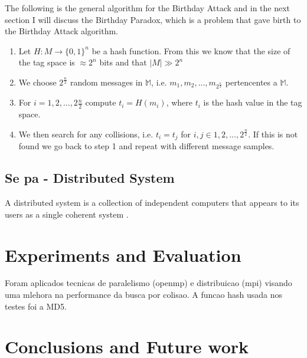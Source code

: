 \documentclass[12pt]{article}
\begin{document}
The following is the general algorithm for the Birthday Attack and in the next section I will discuss
the Birthday Paradox, which is a problem that gave birth to the Birthday Attack algorithm.
\begin{enumerate}
\item Let \(H : M \to \{0,1\}^n\) be a hash function. From this we know that the size of the tag space is \(\approx 2^n\) bits
and that \(| M | \gg 2^n\)
\item We choose \(2^\frac{n}{2}\) random messages in \(\mathbb{M}\), i.e. \(m_1, m_2, ... , m_{2^\frac{n}{2}}\) 
pertencentes a \(\mathbb{M}\).
\item For \(i = 1,2, ... , 2\frac{n}{2}\) compute \(t_i = H(m_i)\), where \(t_i\) is the hash value in the tag space.
\item We then search for any collisions, i.e. \(t_i = t_j\) for \(i, j \in {1, 2, ... , 2^\frac{n}{2}}\). If this is not
found we go back to step 1 and repeat with different message samples.
\end{enumerate}

\subsection{Se pa - Distributed System}
A distributed system is a collection of independent computers that appears to its users as a single 
coherent system \cite{tanenbaum2002distributed}.
 
\section{Experiments and Evaluation}

Foram aplicados tecnicas de paralelismo (openmp) e distribuicao (mpi) visando uma mlehora na performance
da busca por colisao. A funcao hash usada nos testes foi a MD5.

\section{Conclusions and Future work}



\end{document}

